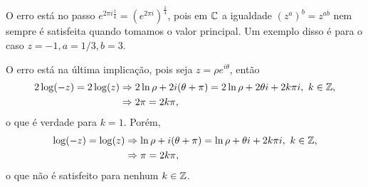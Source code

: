 \begin{questions}
\begin{solution}
    O erro está no passo $e^{2\pi i\frac{1}{4}} = \left(e^{2\pi i} \right)^{\frac{1}{4}}$, pois em ${\mathbb C}$ a igualdade $(z^a)^b = z^{ab}$ nem sempre é satisfeita quando tomamos o valor principal. Um exemplo disso é para o caso $z=-1,a=1/3,b=3$.
\end{solution}

%
\begin{solution}%
    O erro está na última implicação, pois seja $z = \rho e^{i\theta}$, então
    \begin{align*}
        2 \log(-z) = 2\log(z) &\Rightarrow 2\ln \rho + 2i(\theta+\pi) = 2\ln \rho + 2\theta i + 2k\pi i,~ k\in{\mathbb Z}, \\
            &\Rightarrow 2\pi = 2k\pi,
     \end{align*}
     o que é verdade para $k = 1$. Porém,
     \begin{align*}
        \log(-z) = \log(z) &\Rightarrow \ln \rho + i(\theta+\pi) = \ln \rho + \theta i + 2k\pi i,~ k\in{\mathbb Z}, \\
            &\Rightarrow \pi = 2k\pi,
    \end{align*}
    o que não é satisfeito para nenhum $k\in{\mathbb Z}$.
\end{solution}

\end{questions}
